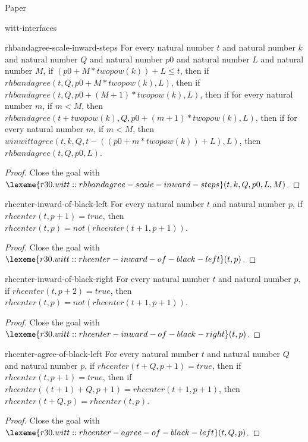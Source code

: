 \begin{lexlean}{Paper}
\begin{section}{witt-interfaces}
  \begin{theorem}{rhbandagree-scale-inward-steps}
  For every natural number \(t\) and natural number \(k\) and natural number \(Q\) and natural number \(p0\) and natural number \(L\) and natural number \(M\), if \((p0 + M * twopow(k)) + L ≤ t\), then if \(rhbandagree(t, Q, p0 + M * twopow(k), L)\), then if \(rhbandagree(t, Q, p0 + (M + 1) * twopow(k), L)\), then if for every natural number \(m\), if \(m < M\), then \(rhbandagree(t + twopow(k), Q, p0 + (m + 1) * twopow(k), L)\), then if for every natural number \(m\), if \(m < M\), then \(winwittagree(t, k, Q, t - ((p0 + m * twopow(k)) + L), L)\), then \(rhbandagree(t, Q, p0, L)\).
  \begin{proof}
  Close the goal with \(\lexeme{r30.witt::rhbandagree-scale-inward-steps}(t, k, Q, p0, L, M)\).
  \end{proof}
  \end{theorem}

  \begin{theorem}{rhcenter-inward-of-black-left}
  For every natural number \(t\) and natural number \(p\), if \(rhcenter(t, p + 1) = true\), then \(rhcenter(t, p) = not(rhcenter(t + 1, p + 1))\).
  \begin{proof}
  Close the goal with \(\lexeme{r30.witt::rhcenter-inward-of-black-left}(t, p)\).
  \end{proof}
  \end{theorem}

  \begin{theorem}{rhcenter-inward-of-black-right}
  For every natural number \(t\) and natural number \(p\), if \(rhcenter(t, p + 2) = true\), then \(rhcenter(t, p) = not(rhcenter(t + 1, p + 1))\).
  \begin{proof}
  Close the goal with \(\lexeme{r30.witt::rhcenter-inward-of-black-right}(t, p)\).
  \end{proof}
  \end{theorem}

  \begin{theorem}{rhcenter-agree-of-black-left}
  For every natural number \(t\) and natural number \(Q\) and natural number \(p\), if \(rhcenter(t + Q, p + 1) = true\), then if \(rhcenter(t, p + 1) = true\), then if \(rhcenter((t + 1) + Q, p + 1) = rhcenter(t + 1, p + 1)\), then \(rhcenter(t + Q, p) = rhcenter(t, p)\).
  \begin{proof}
  Close the goal with \(\lexeme{r30.witt::rhcenter-agree-of-black-left}(t, Q, p)\).
  \end{proof}
  \end{theorem}


\end{section}
\end{lexlean}
